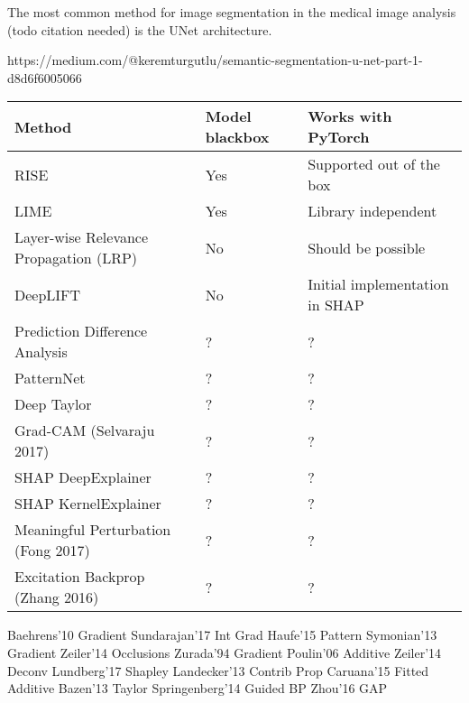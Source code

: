 The most common method for image segmentation in the medical image analysis (todo citation needed) is the UNet\cite{todo} architecture.



https://medium.com/@keremturgutlu/semantic-segmentation-u-net-part-1-d8d6f6005066


\begin{tabular}{| p{7cm} | p{2.5cm} | p{6cm} | }
\hline
\textbf{Method} & \textbf{Model blackbox} & \textbf{Works with PyTorch} \\ \hline
RISE\cite{Petsiuk2018rise} & Yes & Supported out of the box \\ \hline
LIME\cite{ribeiro2016should} & Yes & Library independent \\ \hline
Layer-wise Relevance Propagation (LRP) & No & Should be possible  \\ \hline
DeepLIFT & No & Initial implementation in SHAP\cite{NIPS2017_7062} \\ \hline
Prediction Difference Analysis \cite{todo} & ? & ? \\ \hline
PatternNet & ? & ? \\ \hline
Deep Taylor & ? & ? \\ \hline
Grad-CAM (Selvaraju 2017) & ? & ? \\ \hline
SHAP DeepExplainer & ? & ? \\ \hline
SHAP KernelExplainer & ? & ? \\ \hline
Meaningful Perturbation (Fong 2017)\cite{todo} & ? & ? \\ \hline
Excitation Backprop (Zhang 2016)\cite{todo}  & ? & ? \\ \hline
\end{tabular}







Baehrens'10 Gradient
Sundarajan'17 Int Grad
Haufe'15 Pattern
Symonian'13 Gradient
Zeiler'14 Occlusions
Zurada'94 Gradient
Poulin'06 Additive
Zeiler'14 Deconv
Lundberg'17 Shapley
Landecker'13 Contrib Prop
Caruana'15 Fitted Additive
Bazen'13 Taylor
Springenberg'14 Guided BP
Zhou'16 GAP
